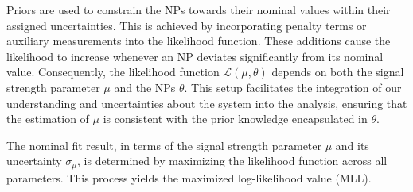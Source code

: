 Priors are used to constrain the NPs towards their nominal values within their assigned uncertainties. This is achieved by incorporating penalty terms or auxiliary measurements into the likelihood function. These additions cause the likelihood to increase whenever an NP deviates significantly from its nominal value. Consequently, the likelihood function $\mathcal{L} (\mu,\theta)$ depends on both the signal strength parameter $\mu$ and the NPs $\theta$. This setup facilitates the integration of our understanding and uncertainties about the system into the analysis, ensuring that the estimation of $\mu$ is consistent with the prior knowledge encapsulated in $\theta$.

The nominal fit result, in terms of the signal strength parameter $\mu$ and its uncertainty $\sigma_{\mu}$, is determined by maximizing the likelihood function across all parameters. This process yields the maximized log-likelihood value (MLL).



